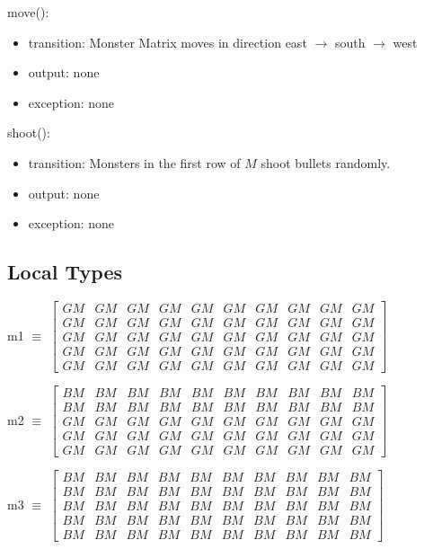 \documentclass[12pt]{article}
\begin{document}
\noindent move():
\begin{itemize}
\item transition: Monster Matrix moves in direction east $\rightarrow$ south $\rightarrow$ west
\item output: none
\item exception: none
\end{itemize}

\noindent shoot():
\begin{itemize}
\item transition: Monsters in the first row of $M$ shoot bullets 
randomly.
\item output: none
\item exception: none
\end{itemize}

\subsection*{Local Types}
m1 $\equiv$ 
$
\begin{bmatrix}
GM & GM & GM & GM & GM & GM & GM & GM & GM & GM \\
GM & GM & GM & GM & GM & GM & GM & GM & GM & GM \\
GM & GM & GM & GM & GM & GM & GM & GM & GM & GM \\
GM & GM & GM & GM & GM & GM & GM & GM & GM & GM \\
GM & GM & GM & GM & GM & GM & GM & GM & GM & GM 
\end{bmatrix}
$

\vspace{1cm}
\noindent 
m2 $\equiv$ 
$
\begin{bmatrix}
BM & BM & BM & BM & BM & BM & BM & BM & BM & BM \\
BM & BM & BM & BM & BM & BM & BM & BM & BM & BM \\
GM & GM & GM & GM & GM & GM & GM & GM & GM & GM \\
GM & GM & GM & GM & GM & GM & GM & GM & GM & GM \\
GM & GM & GM & GM & GM & GM & GM & GM & GM & GM 
\end{bmatrix}
$

\vspace{1cm}
\noindent 
m3 $\equiv$ 
$
\begin{bmatrix}
BM & BM & BM & BM & BM & BM & BM & BM & BM & BM \\
BM & BM & BM & BM & BM & BM & BM & BM & BM & BM \\
BM & BM & BM & BM & BM & BM & BM & BM & BM & BM \\
BM & BM & BM & BM & BM & BM & BM & BM & BM & BM \\
BM & BM & BM & BM & BM & BM & BM & BM & BM & BM 
\end{bmatrix}
$
\end{document}
